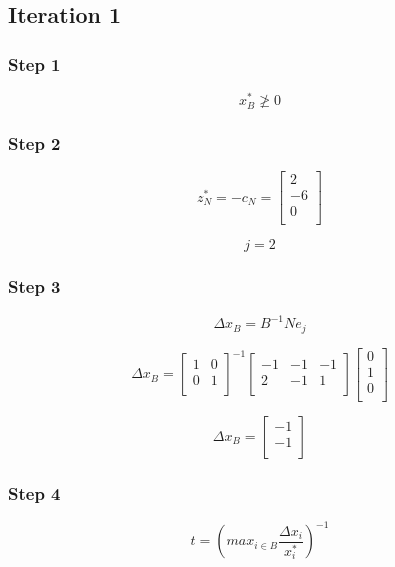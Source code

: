 \documentclass[14pt]{extarticle}
\begin{document}
\subsection*{Iteration 1}
\subsubsection*{Step 1}
\[
    x^*_B \ngeq 0
\]

\subsubsection*{Step 2}
\[
    z^*_N=-c_N=\begin{bmatrix}
        2 \\
        -6 \\
        0 \\
    \end{bmatrix}
\]

\[
    j = 2
\]

\subsubsection*{Step 3}
\[
    \Delta x_B = B^{-1}Ne_j
\]

\[
    \Delta x_B
    =\begin{bmatrix}
        1 & 0 \\
        0 & 1 \\
    \end{bmatrix}^{-1}
    \begin{bmatrix}
        -1 & -1 & -1 \\
        2 & -1 & 1 \\
    \end{bmatrix}
    \begin{bmatrix}
        0 \\
        1 \\
        0 \\
    \end{bmatrix}
\]

\[
    \Delta x_B = 
    \begin{bmatrix}
        -1 \\
        -1 \\
    \end{bmatrix}
\]

\subsubsection*{Step 4}
\[
    t = \left(max_{i \in B} \frac{\Delta x_i}{x^*_i}\right)^{-1}
\]
\end{document}
